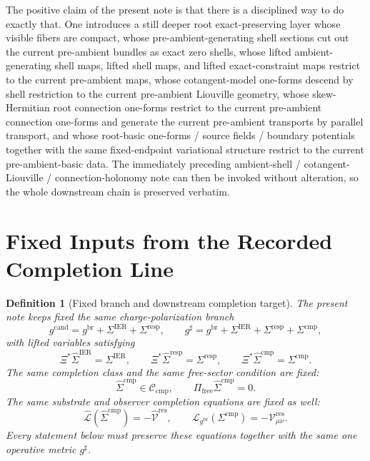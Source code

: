 \documentclass[11pt]{article}
\newcommand{\ObserverMap}{\Xi}
\newcommand{\ObserverMetric}{g^{\mathrm{br}}}
\newcommand{\CandidateMetric}{g^{\mathrm{cand}}}
\newcommand{\CompletedMetric}{g^{\sharp}}
\newcommand{\BaseShift}{\Sigma^{\mathrm{IER}}}
\newcommand{\ResponseShift}{\Sigma^{\mathrm{resp}}}
\newcommand{\CompShift}{\Sigma^{\mathrm{cmp}}}
\newcommand{\BaseLift}{\widehat\Sigma^{\mathrm{IER}}}
\newcommand{\ResponseLift}{\widehat\Sigma^{\mathrm{resp}}}
\newcommand{\CompLift}{\widehat\Sigma^{\mathrm{cmp}}}
\newcommand{\ResidualCore}{\mathcal V_{\mu\nu}^{\mathrm{res}}}
\newcommand{\ResidualLift}{\widehat{\mathcal V}^{\mathrm{res}}}
\newcommand{\SubReducedEin}{\widehat{\mathcal L}}
\newcommand{\FreeProj}{\Pi_{\mathrm{free}}}
\newcommand{\ReducedEin}{\mathcal L_{\ObserverMetric}}
\newcommand{\CompClass}{\mathscr C_{\mathrm{cmp}}}
\newtheorem{definition}{Definition}
\begin{document}
The positive claim of the present note is that there is a disciplined way to do exactly that. One introduces a still deeper root exact-preserving layer whose visible fibers are compact, whose pre-ambient-generating shell sections cut out the current pre-ambient bundles as exact zero shells, whose lifted ambient-generating shell maps, lifted shell maps, and lifted exact-constraint maps restrict to the current pre-ambient maps, whose cotangent-model one-forms descend by shell restriction to the current pre-ambient Liouville geometry, whose skew-Hermitian root connection one-forms restrict to the current pre-ambient connection one-forms and generate the current pre-ambient transports by parallel transport, and whose root-basic one-forms / source fields / boundary potentials together with the same fixed-endpoint variational structure restrict to the current pre-ambient-basic data. The immediately preceding ambient-shell / cotangent-Liouville / connection-holonomy note can then be invoked without alteration, so the whole downstream chain is preserved verbatim.

\section{Fixed Inputs from the Recorded Completion Line}

\begin{definition}[Fixed branch and downstream completion target]
\label{def:fixed_branch}
The present note keeps fixed the same charge-polarization branch
\begin{equation}
\CandidateMetric
=
\ObserverMetric+\BaseShift+\ResponseShift,
\qquad
\CompletedMetric
=
\ObserverMetric+\BaseShift+\ResponseShift+\CompShift,
\label{eq:fixed_metrics}
\end{equation}
with lifted variables satisfying
\begin{equation}
\ObserverMap^*\BaseLift=\BaseShift,
\qquad
\ObserverMap^*\ResponseLift=\ResponseShift,
\qquad
\ObserverMap^*\CompLift=\CompShift.
\label{eq:fixed_lifts}
\end{equation}
The same completion class and the same free-sector condition are fixed:
\begin{equation}
\CompLift\in\CompClass,
\qquad
\FreeProj\CompLift=0.
\label{eq:fixed_free}
\end{equation}
The same substrate and observer completion equations are fixed as well:
\begin{equation}
\SubReducedEin(\CompLift)=-\ResidualLift,
\qquad
\ReducedEin(\CompShift)=-\ResidualCore.
\label{eq:fixed_solves}
\end{equation}
Every statement below must preserve these equations together with the same one operative metric \(\CompletedMetric\).
\end{definition}
\end{document}
